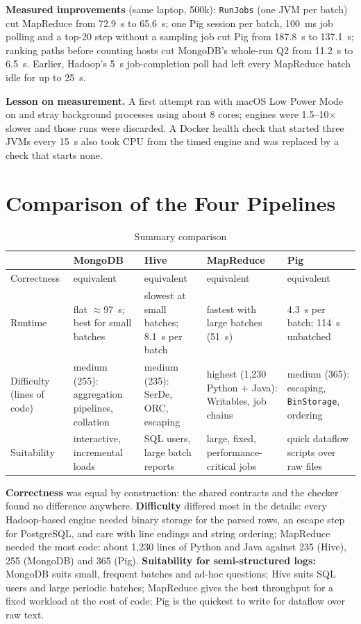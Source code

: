 \documentclass[conference]{IEEEtran}
\newcommand{\code}[1]{\texttt{\small #1}}
\begin{document}
\textbf{Measured improvements} (same laptop, 500k): \code{RunJobs} (one JVM per batch) cut
MapReduce from 72.9~s to 65.6~s; one Pig session per batch, 100~ms job polling and a top-20 step
without a sampling job cut Pig from 187.8~s to 137.1~s; ranking paths before counting hosts cut
MongoDB's whole-run Q2 from 11.2~s to 6.5~s. Earlier, Hadoop's 5~s job-completion poll had left
every MapReduce batch idle for up to 25~s.

\textbf{Lesson on measurement.} A first attempt ran with macOS Low Power Mode on and stray
background processes using about 8 cores; engines were 1.5--10$\times$ slower and those runs were
discarded. A Docker health check that started three JVMs every 15~s also took CPU from the timed
engine and was replaced by a check that starts none.

\section{Comparison of the Four Pipelines}
\begin{table}[h]
\caption{Summary comparison}
\label{tab:compare}
\centering
\scriptsize
\setlength{\tabcolsep}{3pt}
\begin{tabular}{@{}L{0.15\columnwidth}L{0.19\columnwidth}L{0.18\columnwidth}L{0.19\columnwidth}L{0.19\columnwidth}@{}}
\toprule
 & MongoDB & Hive & MapReduce & Pig \\
\midrule
Correctness & equivalent & equivalent & equivalent & equivalent \\
Runtime & flat $\approx$97~s; best for small batches & slowest at small batches; 8.1~s per batch & fastest with large batches (51~s) & 4.3~s per batch; 114~s unbatched \\
Difficulty (lines of code) & medium (255): aggregation pipelines, collation & medium (235): SerDe, ORC, escaping & highest (1,230 Python + Java): Writables, job chains & medium (365): escaping, \texttt{BinStorage}, ordering \\
Suitability & interactive, incremental loads & SQL users, large batch reports & large, fixed, performance-critical jobs & quick dataflow scripts over raw files \\
\bottomrule
\end{tabular}
\end{table}

\textbf{Correctness} was equal by construction: the shared contracts and the checker found no
difference anywhere. \textbf{Difficulty} differed most in the details: every Hadoop-based engine
needed binary storage for the parsed rows, an escape step for PostgreSQL, and care with line
endings and string ordering; MapReduce needed the most code: about 1,230 lines of Python and Java against 235 (Hive), 255 (MongoDB) and 365 (Pig). \textbf{Suitability for
semi-structured logs:} MongoDB suits small, frequent batches and ad-hoc questions; Hive suits SQL
users and large periodic batches; MapReduce gives the best throughput for a fixed workload at the
cost of code; Pig is the quickest to write for dataflow over raw text.
\end{document}
